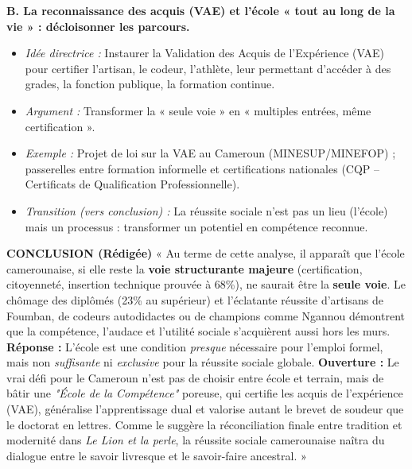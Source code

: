 \documentclass[11pt]{article}
\begin{document}
\begin{exoresolu}
\noindent\textbf{B. La reconnaissance des acquis (VAE) et l'école « tout au long de la vie » : décloisonner les parcours.}
\begin{itemize}
    \item \textit{Idée directrice :} Instaurer la Validation des Acquis de l'Expérience (VAE) pour certifier l'artisan, le codeur, l'athlète, leur permettant d'accéder à des grades, la fonction publique, la formation continue.
    \item \textit{Argument :} Transformer la « seule voie » en « multiples entrées, même certification ».
    \item \textit{Exemple :} Projet de loi sur la VAE au Cameroun (MINESUP/MINEFOP) ; passerelles entre formation informelle et certifications nationales (CQP -- Certificats de Qualification Professionnelle).
    \item \textit{Transition (vers conclusion) :} La réussite sociale n'est pas un lieu (l'école) mais un processus : transformer un potentiel en compétence reconnue.
\end{itemize}

\noindent\textbf{CONCLUSION (Rédigée)}
« Au terme de cette analyse, il apparaît que l'école camerounaise, si elle reste la \textbf{voie structurante majeure} (certification, citoyenneté, insertion technique prouvée à 68\%), ne saurait être la \textbf{seule voie}. Le chômage des diplômés (23\% au supérieur) et l'éclatante réussite d'artisans de Foumban, de codeurs autodidactes ou de champions comme Ngannou démontrent que la compétence, l'audace et l'utilité sociale s'acquièrent aussi hors les murs. \textbf{Réponse :} L'école est une condition \emph{presque} nécessaire pour l'emploi formel, mais non \emph{suffisante} ni \emph{exclusive} pour la réussite sociale globale. \textbf{Ouverture :} Le vrai défi pour le Cameroun n'est pas de choisir entre école et terrain, mais de bâtir une \emph{"École de la Compétence"} poreuse, qui certifie les acquis de l'expérience (VAE), généralise l'apprentissage dual et valorise autant le brevet de soudeur que le doctorat en lettres. Comme le suggère la réconciliation finale entre tradition et modernité dans \emph{Le Lion et la perle}, la réussite sociale camerounaise naîtra du dialogue entre le savoir livresque et le savoir-faire ancestral. »


\end{exoresolu}
\end{document}
